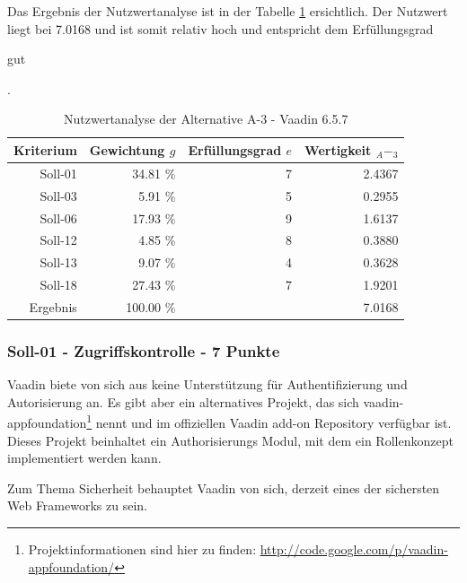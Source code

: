   Das Ergebnis der Nutzwertanalyse ist in der Tabelle \ref{tab:nwaA3}
  ersichtlich. Der Nutzwert liegt bei 7.0168 und ist somit relativ hoch und
  entspricht dem Erfüllungsgrad \begin{itshape}gut\end{itshape}.
    
  \begin{table}[ht]
    \sffamily 
    \begin{center}
      \begin{tabular}{r|rrr}
        \toprule
        \textbf{Kriterium} & \textbf{Gewichtung \(g\)} & \textbf{Erfüllungsgrad
        \(e\)} & \textbf{Wertigkeit \(_A-_3\)} \\
        \midrule
        Soll-01   & 34.81 \% & 7 & 2.4367 \\
        Soll-03   &  5.91 \% & 5 & 0.2955 \\
        Soll-06   & 17.93 \% & 9 & 1.6137 \\
        Soll-12   &  4.85 \% & 8 & 0.3880 \\
        Soll-13   &  9.07 \% & 4 & 0.3628 \\
        Soll-18   & 27.43 \% & 7 & 1.9201 \\
        \midrule
        \midrule
        Ergebnis  & 100.00 \% &   & 7.0168 \\
        \bottomrule
      \end{tabular}
      \caption{Nutzwertanalyse der Alternative A-3 - Vaadin 6.5.7}
      \label{tab:nwaA3}
    \end{center}
  \end{table}
  
  \subsubsection{Soll-01 - Zugriffskontrolle - 7 Punkte}
  
  Vaadin biete von sich aus keine Unterstützung für Authentifizierung und
  Autorisierung an. Es gibt aber ein alternatives Projekt, das sich
  vaadin-appfoundation\footnote{Projektinformationen sind hier zu finden:
  \url{http://code.google.com/p/vaadin-appfoundation/}} nennt und im
  offiziellen Vaadin add-on Repository verfügbar ist. Dieses Projekt beinhaltet
  ein Authorisierungs Modul, mit dem ein Rollenkonzept implementiert werden kann.
  
  Zum Thema Sicherheit behauptet Vaadin von sich, derzeit eines der sichersten
  Web Frameworks zu sein.
  
